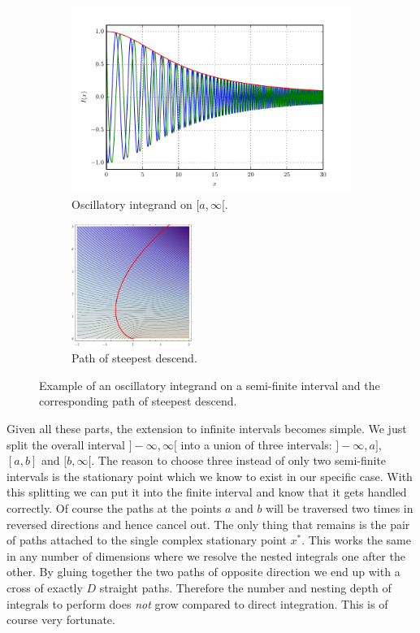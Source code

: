 \documentclass[a4paper,10pt]{article}
\begin{document}
\begin{figure}[h!]
  \begin{subfigure}[t]{0.5\linewidth}
    \centering
    \includegraphics[width=\linewidth]{./fig/oscillatory_example_semiopen.pdf}
    \caption{Oscillatory integrand on $[a, \infty[$.}
    \label{fig:oscillatory_example_semiopen_integrand}
  \end{subfigure}
  \begin{subfigure}[t]{0.5\linewidth}
    \centering
    \includegraphics[height=4cm]{./fig/oscillatory_example_semiopen_path.pdf}
    \caption{Path of steepest descend.}
    \label{fig:oscillatory_example_semiopen_path}
  \end{subfigure}
  \caption{\label{fig:oscillatory_example_semiopen}
  Example of an oscillatory integrand on a semi-finite interval and the
  corresponding path of steepest descend.}
\end{figure}

Given all these parts, the extension to infinite intervals becomes simple.
We just split the overall interval $]-\infty, \infty[$ into a union of three
intervals: $]-\infty, a]$, $[a,b]$ and $[b,\infty[$. The reason to choose three
instead of only two semi-finite intervals is the stationary point which we know
to exist in our specific case. With this splitting we can put it into the finite
interval and know that it gets handled correctly. Of course the paths at the points
$a$ and $b$ will be traversed two times in reversed directions and hence cancel out.
The only thing that remains is the pair of paths attached to the single complex stationary
point $x^{*}$. This works the same in any number of dimensions where we resolve the nested
integrals one after the other. By gluing together the two paths of opposite direction
we end up with a cross of exactly $D$ straight paths. Therefore the number and nesting
depth of integrals to perform does \emph{not} grow compared to direct integration.
This is of course very fortunate.
\end{document}
